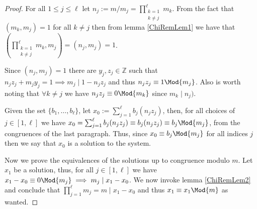 \begin{proof}
   For all \(1 \leqslant j \leqslant \ell\) let \(n_j := m/m_j =
   \prod_{\substack{k = 1 \\ k \neq j}}^{\ell} m_k\). From the fact that \((m_k,
   m_j) = 1\) for all \(k \neq j\) then from lemma \ref{ChiRemLem1} we have that
   \((\prod_{\substack{k=1 \\ k \neq j}}^\ell m_k, m_j) = (n_j, m_j) = 1\). 

   Since \((n_j, m_j) = 1\) there are  \(y_j, z_j \in \mathbb{Z}\) such that
   \(n_jz_j + m_jy_j = 1 \implies m_j \mid 1 - n_j z_j\) and thus \(n_jz_j
   \equiv 1 \Mod{m_j}\). Also is worth noting that \(\forall k \neq j\) we have
   \(n_jz_j \equiv 0 \Mod{m_k}\) since  \(m_k \mid n_j)\).

   Given the set \(\{b_1, \dots, b_\ell\}\), let \(x_0 := \sum_{j=1}^\ell b_j
   (n_j z_j)\), then, for all choices of \(j \in [1, \ell]\) we have \(x_0 =
   \sum_{j=1}^\ell b_j(n_jz_j) \equiv b_j(n_jz_j) \equiv b_j \Mod{m_j}\), from
   the congruences of the last paragraph. Thus, since \(x_0 \equiv b_j
   \Mod{m_j}\) for all indices  \(j\) then we say that  \(x_0\) is a solution to
   the system.

   Now we prove the equivalences of the solutions up to congruence modulo \(m\).
   Let \(x_1\) be a solution, thus, for all  \(j \in [1, \ell]\) we have \(x_1 -
   x_0 \equiv 0 \Mod{m_j} \implies m_j \mid x_1 - x_0\). We now invoke lemma
   \ref{ChiRemLem2} and conclude that \(\prod_{j=1}^{\ell} m_j = m \mid x_1 -
   x_0\) and thus \(x_1 \equiv x_1 \Mod{m}\) as wanted.
\end{proof}

